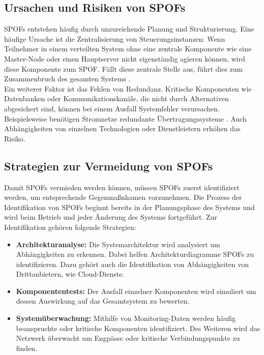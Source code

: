 \documentclass[a4paper,12pt]{article}
\begin{document}
\subsection{Ursachen und Risiken von SPOFs}
SPOFs entstehen häufig durch unzureichende Planung und Strukturierung. Eine häufige Ursache ist die Zentralisierung von Steuerungsinstanzen: Wenn Teilnehmer in einem verteilten System ohne eine zentrale Komponente wie eine Master-Node oder einen Hauptserver nicht eigenständig agieren können, wird diese Komponente zum SPOF. Fällt diese zentrale Stelle aus, führt dies zum Zusammenbruch des gesamten Systems \cite[S. 253f.]{Steen2006}.\\
Ein weiterer Faktor ist das Fehlen von Redundanz. Kritische Komponenten wie Datenbanken oder Kommunikationskanäle, die nicht durch Alternativen abgesichert sind, können bei einem Ausfall Systemfehler verursachen. Beispielsweise benötigen Stromnetze redundante Übertragungssysteme \cite[S. 61f.]{Jarass2009}. Auch Abhängigkeiten von einzelnen Technologien oder Dienstleistern erhöhen das Risiko. 


\subsection{Strategien zur Vermeidung von SPOFs}

Damit SPOFs vermieden werden können, müssen SPOFs zuerst identifiziert werden, um entsprechende Gegenmaßnhamen vorzunehmen. Die Prozess der Identifikation von SPOFs beginnt bereits in der Planungsphase des Systems und wird beim Betrieb und jeder Änderung des Systems fortgeführt. Zur Identifikation gehören folgende Strategien:

\begin{itemize}
    \item \textbf{Architekturanalyse:} Die Systemarchitektur wird analysiert um Abhängigkeiten zu erkennen. Dabei helfen Architekturdiagramme SPOFs zu identifizieren. Dazu gehört auch die Identifikation von Abhängigkeiten von Drittanbietern, wie Cloud-Dienste.
    \item \textbf{Komponententests:} Der Ausfall einzelner Komponenten wird simuliert um dessen Auswirkung auf das Gesamtsystem zu bewerten.
    \item \textbf{Systemüberwachung:} Mithilfe von Monitoring-Daten werden häufig beanspruchte oder kritische Komponenten identifiziert. Des Weiteren wird das Netzwerk überwacht um Engpässe oder kritische Verbindungspunkte zu finden. 
\end{itemize}
\end{document}
